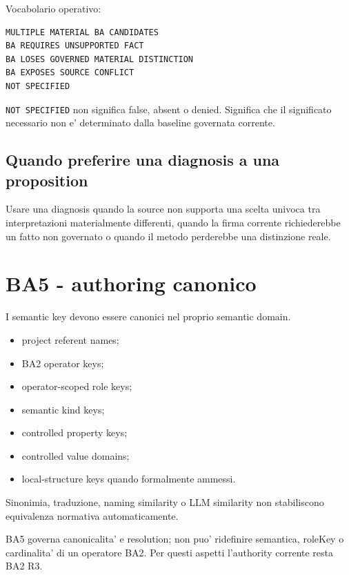 \documentclass[11pt,a4paper]{article}
\providecommand{\stabletag}{\ddtatag{DDTAGreen}{CURRENT / PRESERVED}}
\begin{document}
Vocabolario operativo:
\begin{lstlisting}
MULTIPLE MATERIAL BA CANDIDATES
BA REQUIRES UNSUPPORTED FACT
BA LOSES GOVERNED MATERIAL DISTINCTION
BA EXPOSES SOURCE CONFLICT
NOT SPECIFIED
\end{lstlisting}

\begin{ddtacore}[title={NOT SPECIFIED}]
\texttt{NOT SPECIFIED} non significa false, absent o denied. Significa che il significato necessario non e' determinato dalla baseline governata corrente.
\end{ddtacore}

\subsection{Quando preferire una diagnosis a una proposition}
Usare una diagnosis quando la source non supporta una scelta univoca tra interpretazioni materialmente differenti, quando la firma corrente richiederebbe un fatto non governato o quando il metodo perderebbe una distinzione reale.

\section{BA5 - authoring canonico}
\stabletag

I semantic key devono essere canonici nel proprio semantic domain.

\begin{itemize}
  \item project referent names;
  \item BA2 operator keys;
  \item operator-scoped role keys;
  \item semantic kind keys;
  \item controlled property keys;
  \item controlled value domains;
  \item local-structure keys quando formalmente ammessi.
\end{itemize}

Sinonimia, traduzione, naming similarity o LLM similarity non stabiliscono equivalenza normativa automaticamente.

\begin{ddtacore}[title={Registry boundary}]
BA5 governa canonicalita' e resolution; non puo' ridefinire semantica, roleKey o cardinalita' di un operatore BA2. Per questi aspetti l'authority corrente resta BA2 R3.
\end{ddtacore}
\end{document}

